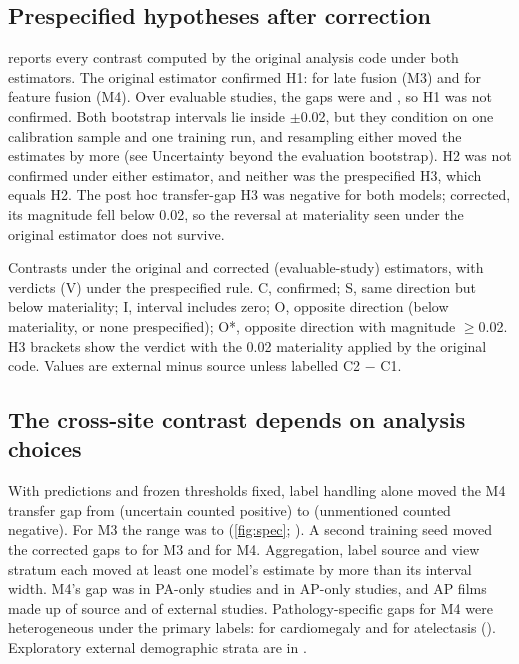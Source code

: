 \subsection*{Prespecified hypotheses after correction}
 reports every contrast computed by the original analysis code
under both estimators. The original estimator confirmed H1: \HOneMThreeOrig{} for late
fusion (M3) and \HOneMFourOrig{} for feature fusion (M4). Over evaluable studies,
the gaps were \HOneMThreeEval{} and \HOneMFourEval{}, so H1 was not confirmed.
Both bootstrap intervals lie inside $\pm$0.02, but they condition on one
calibration sample and one training run, and resampling either moved the
estimates by more (see Uncertainty beyond the evaluation bootstrap). H2 was not confirmed under either estimator, and neither was the
prespecified H3, which equals H2. The post hoc transfer-gap H3 was negative for
both models; corrected, its magnitude fell below 0.02, so the reversal at materiality seen
under the original estimator does not survive.

\begin{table}[H]
\centering\footnotesize
\caption{Contrasts under the original and corrected (evaluable-study)
estimators, with verdicts (V) under the prespecified rule. C, confirmed; S, same
direction but below materiality; I, interval includes zero; O, opposite
direction (below materiality, or none prespecified); O*, opposite direction with
magnitude $\ge$0.02. H3 brackets show the verdict with the 0.02 materiality
applied by the original code. Values are external minus source unless
labelled C2 $-$ C1.}
\label{tab:hyp}
\begin{adjustbox}{max width=\linewidth}

\end{adjustbox}
\end{table}

\subsection*{The cross-site contrast depends on analysis choices}
With predictions and frozen thresholds fixed, label handling alone moved the
M4 transfer gap from \SensUncPosHOneMFour{} (uncertain counted positive) to
\SensUnmNegHOneMFour{} (unmentioned counted negative). For M3 the range was
\SensTTenHOneMThreePt{} to \SensUnmNegHOneMThreePt{} (\cref{fig:spec};
). A second training seed moved the corrected gaps to
\SensSeedHOneMThree{} for M3 and \SensSeedHOneMFour{} for M4. Aggregation, label
source and view stratum each moved at least one model's estimate by more than
its interval width. M4's gap was \ViewPAMFour{} in PA-only studies and
\ViewAPMFour{} in AP-only studies, and AP films made up \APShareSrc{} of source
and \APShareExt{} of external studies. Pathology-specific gaps for M4 were
heterogeneous under the primary labels: \PathMFourCard{} for cardiomegaly and
\PathMFourAtel{} for atelectasis (). Exploratory external
demographic strata are in .

